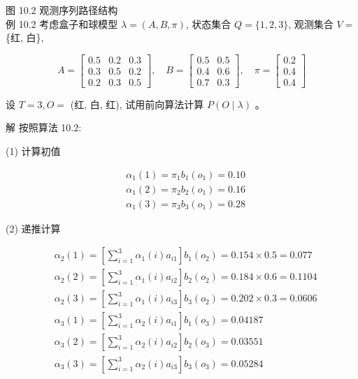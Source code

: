 \documentclass[10pt]{article}
\begin{document}
图 10.2 观测序列路径结构\\
例 10.2 考虑盒子和球模型 $\lambda=(A, B, \pi)$, 状态集合 $Q=\{1,2,3\}$, 观测集合 $V=$ \{红, 白\},

$$
A=\left[\begin{array}{lll}
0.5 & 0.2 & 0.3 \\
0.3 & 0.5 & 0.2 \\
0.2 & 0.3 & 0.5
\end{array}\right], \quad B=\left[\begin{array}{cc}
0.5 & 0.5 \\
0.4 & 0.6 \\
0.7 & 0.3
\end{array}\right], \quad \pi=\left[\begin{array}{l}
0.2 \\
0.4 \\
0.4
\end{array}\right]
$$

设 $T=3, O=$ (红, 白, 红), 试用前向算法计算 $P(O \mid \lambda)$ 。

解 按照算法 10.2:

(1) 计算初值

$$
\begin{aligned}
& \alpha_{1}(1)=\pi_{1} b_{1}\left(o_{1}\right)=0.10 \\
& \alpha_{1}(2)=\pi_{2} b_{2}\left(o_{1}\right)=0.16 \\
& \alpha_{1}(3)=\pi_{3} b_{3}\left(o_{1}\right)=0.28
\end{aligned}
$$

(2) 递推计算

$$
\begin{aligned}
& \alpha_{2}(1)=\left[\sum_{i=1}^{3} \alpha_{1}(i) a_{i 1}\right] b_{1}\left(o_{2}\right)=0.154 \times 0.5=0.077 \\
& \alpha_{2}(2)=\left[\sum_{i=1}^{3} \alpha_{1}(i) a_{i 2}\right] b_{2}\left(o_{2}\right)=0.184 \times 0.6=0.1104 \\
& \alpha_{2}(3)=\left[\sum_{i=1}^{3} \alpha_{1}(i) a_{i 3}\right] b_{3}\left(o_{2}\right)=0.202 \times 0.3=0.0606 \\
& \alpha_{3}(1)=\left[\sum_{i=1}^{3} \alpha_{2}(i) a_{i 1}\right] b_{1}\left(o_{3}\right)=0.04187 \\
& \alpha_{3}(2)=\left[\sum_{i=1}^{3} \alpha_{2}(i) a_{i 2}\right] b_{2}\left(o_{3}\right)=0.03551 \\
& \alpha_{3}(3)=\left[\sum_{i=1}^{3} \alpha_{2}(i) a_{i 3}\right] b_{3}\left(o_{3}\right)=0.05284
\end{aligned}
$$
\end{document}
